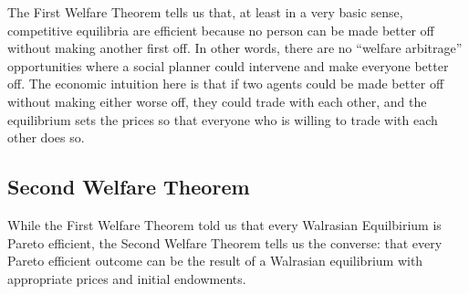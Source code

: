 The First Welfare Theorem tells us that, at least in a very basic sense, competitive equilibria are efficient because no person can be made better off without making another first off. In other words, there are no ``welfare arbitrage'' opportunities where a social planner could intervene and make everyone better off. The economic intuition here is that if two agents could be made better off without making either worse off, they could trade with each other, and the equilibrium sets the prices so that everyone who is willing to trade with each other does so. 

\subsection*{Second Welfare Theorem}
While the First Welfare Theorem told us that every Walrasian Equilbirium is Pareto efficient, the Second Welfare Theorem tells us the converse: that every Pareto efficient outcome can be the result of a Walrasian equilibrium with appropriate prices and initial endowments. 

